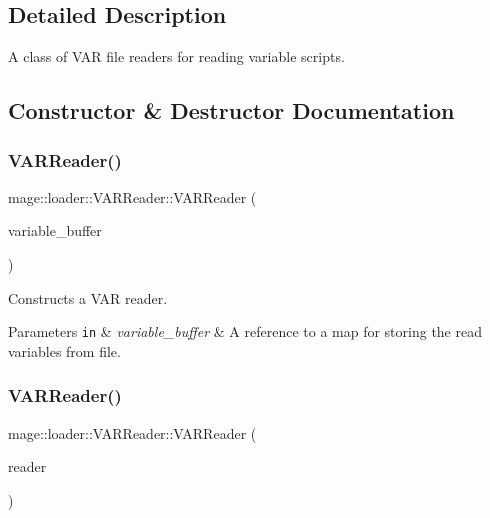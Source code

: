 \subsection{Detailed Description}
A class of V\+AR file readers for reading variable scripts. 

\subsection{Constructor \& Destructor Documentation}
\mbox{\label{classmage_1_1loader_1_1_v_a_r_reader_ae06b2b97d9a0ce16047b0c8cfcd4a73f}} 
\subsubsection{\texorpdfstring{V\+A\+R\+Reader()}{VARReader()}\hspace{0.1cm}{\footnotesize\ttfamily [1/3]}}
{\footnotesize\ttfamily mage\+::loader\+::\+V\+A\+R\+Reader\+::\+V\+A\+R\+Reader (\begin{DoxyParamCaption}\item[{std\+::map$<$ string, \mbox{\hyperlink{namespacemage_aa1fe0628487e0706e44efdc62dbdb3a2}{Value}} $>$ \&}]{variable\+\_\+buffer }\end{DoxyParamCaption})\hspace{0.3cm}{\ttfamily [explicit]}}

Constructs a V\+AR reader.


\begin{DoxyParams}[1]{Parameters}
\mbox{\tt in}  & {\em variable\+\_\+buffer} & A reference to a map for storing the read variables from file. \\
\hline
\end{DoxyParams}
\mbox{\label{classmage_1_1loader_1_1_v_a_r_reader_ab4ab4d94c90a2797ae40e54e0dd7c127}} 
\subsubsection{\texorpdfstring{V\+A\+R\+Reader()}{VARReader()}\hspace{0.1cm}{\footnotesize\ttfamily [2/3]}}
{\footnotesize\ttfamily mage\+::loader\+::\+V\+A\+R\+Reader\+::\+V\+A\+R\+Reader (\begin{DoxyParamCaption}\item[{const \mbox{\hyperlink{classmage_1_1loader_1_1_v_a_r_reader}{V\+A\+R\+Reader}} \&}]{reader }\end{DoxyParamCaption})\hspace{0.3cm}{\ttfamily [delete]}}

